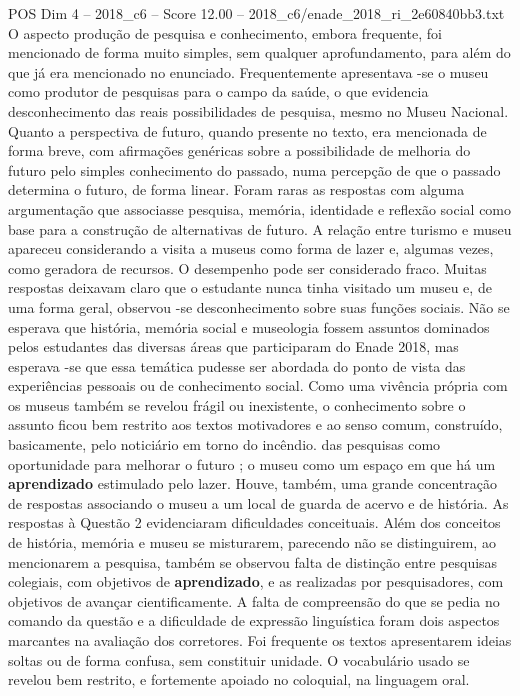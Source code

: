 \begin{textsample}{POS Dim 4 – 2018\_c6 – Score 12.00 – 2018\_c6/enade\_2018\_ri\_2e60840bb3.txt}
O aspecto produção de pesquisa e conhecimento, embora frequente, foi mencionado de forma muito simples, sem qualquer aprofundamento, para além do que já era mencionado no enunciado.
Frequentemente apresentava -se o museu como produtor de pesquisas para o campo da saúde, o que evidencia desconhecimento das reais possibilidades de pesquisa, mesmo no Museu Nacional.
Quanto a perspectiva de futuro, quando presente no texto, era mencionada de forma breve, com afirmações genéricas sobre a possibilidade de melhoria do futuro pelo simples conhecimento do passado, numa percepção de que o passado determina o futuro, de forma linear.
Foram raras as respostas com alguma argumentação que associasse pesquisa, memória, identidade e reflexão social como base para a construção de alternativas de futuro.
A relação entre turismo e museu apareceu considerando a visita a museus como forma de lazer e, algumas vezes, como geradora de recursos.
O desempenho pode ser considerado fraco.
Muitas respostas deixavam claro que o estudante nunca tinha visitado um museu e, de uma forma geral, observou -se desconhecimento sobre suas funções sociais.
Não se esperava que história, memória social e museologia fossem assuntos dominados pelos estudantes das diversas áreas que participaram do Enade 2018, mas esperava -se que essa temática pudesse ser abordada do ponto de vista das experiências pessoais ou de conhecimento social.
Como uma vivência própria com os museus também se revelou frágil ou inexistente, o conhecimento sobre o assunto ficou bem restrito aos textos motivadores e ao senso comum, construído, basicamente, pelo noticiário em torno do incêndio. das pesquisas como oportunidade para melhorar o futuro ; o museu como um espaço em que há um \textbf{aprendizado} estimulado pelo lazer.
Houve, também, uma grande concentração de respostas associando o museu a um local de guarda de acervo e de história.
As respostas à Questão 2 evidenciaram dificuldades conceituais.
Além dos conceitos de história, memória e museu se misturarem, parecendo não se distinguirem, ao mencionarem a pesquisa, também se observou falta de distinção entre pesquisas colegiais, com objetivos de \textbf{aprendizado}, e as realizadas por pesquisadores, com objetivos de avançar cientificamente.
A falta de compreensão do que se pedia no comando da questão e a dificuldade de expressão linguística foram dois aspectos marcantes na avaliação dos corretores.
Foi frequente os textos apresentarem ideias soltas ou de forma confusa, sem constituir unidade.
O vocabulário usado se revelou bem restrito, e fortemente apoiado no coloquial, na linguagem oral.

\end{textsample}
